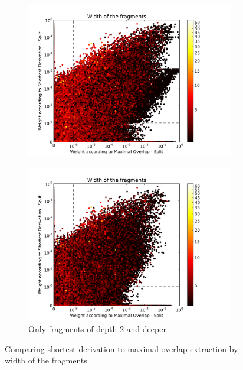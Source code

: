 \begin{figure}
\center
\begin{subfigure}{0.45\textwidth}
\includegraphics[width=\linewidth,trim=0.5cm 0cm 2.5cm 0.5cm, clip=true]{../data/plots/6.png}
\caption{}
\label{f:width1a}
\end{subfigure}
\begin{subfigure}{0.45\textwidth}
\includegraphics[width=\linewidth,trim=0.5cm 0cm 2.5cm 0.5cm, clip=true]{../data/plots/9.png}
\caption{Only fragments of depth 2 and deeper}
\label{f:width1b}
\end{subfigure}
\caption{Comparing shortest derivation to maximal overlap extraction by width of the fragments}
\label{f:width1}
\end{figure}






























